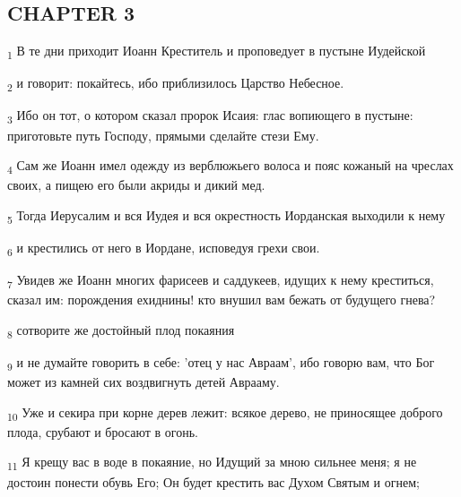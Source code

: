 \subsection{CHAPTER 3}
\begin{tcolorbox}
\textsubscript{1} В те дни приходит Иоанн Креститель и проповедует в пустыне Иудейской
\end{tcolorbox}
\begin{tcolorbox}
\textsubscript{2} и говорит: покайтесь, ибо приблизилось Царство Небесное.
\end{tcolorbox}
\begin{tcolorbox}
\textsubscript{3} Ибо он тот, о котором сказал пророк Исаия: глас вопиющего в пустыне: приготовьте путь Господу, прямыми сделайте стези Ему.
\end{tcolorbox}
\begin{tcolorbox}
\textsubscript{4} Сам же Иоанн имел одежду из верблюжьего волоса и пояс кожаный на чреслах своих, а пищею его были акриды и дикий мед.
\end{tcolorbox}
\begin{tcolorbox}
\textsubscript{5} Тогда Иерусалим и вся Иудея и вся окрестность Иорданская выходили к нему
\end{tcolorbox}
\begin{tcolorbox}
\textsubscript{6} и крестились от него в Иордане, исповедуя грехи свои.
\end{tcolorbox}
\begin{tcolorbox}
\textsubscript{7} Увидев же Иоанн многих фарисеев и саддукеев, идущих к нему креститься, сказал им: порождения ехиднины! кто внушил вам бежать от будущего гнева?
\end{tcolorbox}
\begin{tcolorbox}
\textsubscript{8} сотворите же достойный плод покаяния
\end{tcolorbox}
\begin{tcolorbox}
\textsubscript{9} и не думайте говорить в себе: 'отец у нас Авраам', ибо говорю вам, что Бог может из камней сих воздвигнуть детей Аврааму.
\end{tcolorbox}
\begin{tcolorbox}
\textsubscript{10} Уже и секира при корне дерев лежит: всякое дерево, не приносящее доброго плода, срубают и бросают в огонь.
\end{tcolorbox}
\begin{tcolorbox}
\textsubscript{11} Я крещу вас в воде в покаяние, но Идущий за мною сильнее меня; я не достоин понести обувь Его; Он будет крестить вас Духом Святым и огнем;
\end{tcolorbox}

